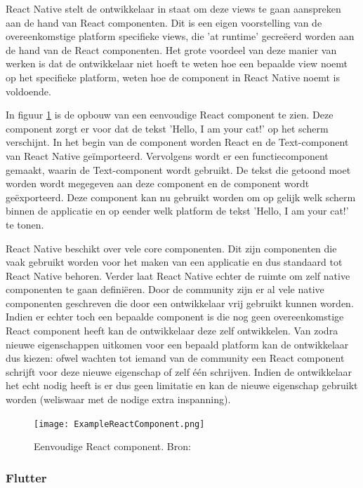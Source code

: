 React Native stelt de ontwikkelaar in staat om deze views te gaan aanspreken aan de hand van React componenten. Dit is een eigen voorstelling van de overeenkomstige platform specifieke views, die 'at runtime' gecreëerd worden aan de hand van de React componenten. Het grote voordeel van deze manier van werken is dat de ontwikkelaar niet hoeft te weten hoe een bepaalde view noemt op het specifieke platform, weten hoe de component in React Native noemt is voldoende. 

In figuur \ref{fig:reactComponent} is de opbouw van een eenvoudige React component te zien. Deze component zorgt er voor dat de tekst 'Hello, I am your cat!' op het scherm verschijnt. In het begin van de component worden React en de Text-component van React Native geïmporteerd. Vervolgens wordt er een functiecomponent gemaakt, waarin de Text-component wordt gebruikt. De tekst die getoond moet worden wordt megegeven aan deze component en de component wordt geëxporteerd. Deze component kan nu gebruikt worden om op gelijk welk scherm binnen de applicatie en op eender welk platform de tekst 'Hello, I am your cat!' te tonen.


React Native beschikt over vele core componenten. Dit zijn componenten die vaak gebruikt worden voor het maken van een applicatie en dus standaard tot React Native behoren. Verder laat React Native echter de ruimte om zelf native componenten te gaan definiëren. Door de community zijn er al vele native componenten geschreven die door een ontwikkelaar vrij gebruikt kunnen worden. Indien er echter toch een bepaalde component is die nog geen overeenkomstige React component heeft kan de ontwikkelaar deze zelf ontwikkelen. Van zodra nieuwe eigenschappen uitkomen voor een bepaald platform kan de ontwikkelaar dus kiezen: ofwel wachten tot iemand van de community een React component schrijft voor deze nieuwe eigenschap of zelf één schrijven. Indien de ontwikkelaar het echt nodig heeft is er dus geen limitatie en kan de nieuwe eigenschap gebruikt worden (weliswaar met de nodige extra inspanning).

\begin{figure}
    \texttt{[image: ExampleReactComponent.png]}
    \caption{Eenvoudige React component. Bron:
        \textcite{ReactNative.dev2020}}
    \label{fig:reactComponent}
\end{figure}

\subsubsection{Flutter}
\label{subsubsec:opbouwUIFlutter}

